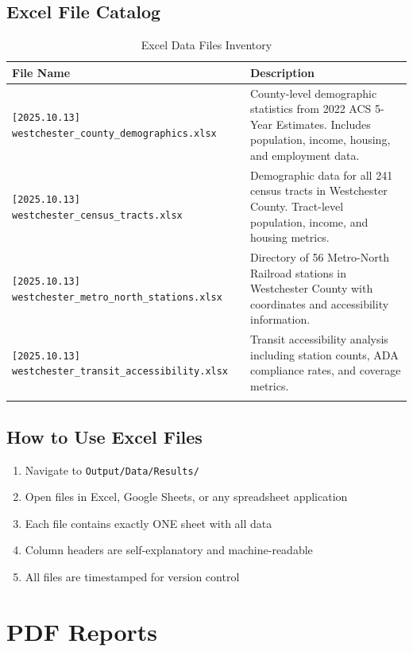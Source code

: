 \documentclass[11pt,letterpaper]{article}
\begin{document}
\subsection{Excel File Catalog}

\begin{longtable}{p{7cm}p{8cm}}
\toprule
\textbf{File Name} & \textbf{Description} \\
\midrule
\endhead

\texttt{[2025.10.13] westchester\_county\_demographics.xlsx} & 
County-level demographic statistics from 2022 ACS 5-Year Estimates. Includes population, income, housing, and employment data. \\

\texttt{[2025.10.13] westchester\_census\_tracts.xlsx} & 
Demographic data for all 241 census tracts in Westchester County. Tract-level population, income, and housing metrics. \\

\texttt{[2025.10.13] westchester\_metro\_north\_stations.xlsx} & 
Directory of 56 Metro-North Railroad stations in Westchester County with coordinates and accessibility information. \\

\texttt{[2025.10.13] westchester\_transit\_accessibility.xlsx} & 
Transit accessibility analysis including station counts, ADA compliance rates, and coverage metrics. \\

\bottomrule
\caption{Excel Data Files Inventory}
\end{longtable}

\subsection{How to Use Excel Files}
\begin{enumerate}
    \item Navigate to \texttt{Output/Data/Results/}
    \item Open files in Excel, Google Sheets, or any spreadsheet application
    \item Each file contains exactly ONE sheet with all data
    \item Column headers are self-explanatory and machine-readable
    \item All files are timestamped for version control
\end{enumerate}

\section{PDF Reports}
\end{document}
